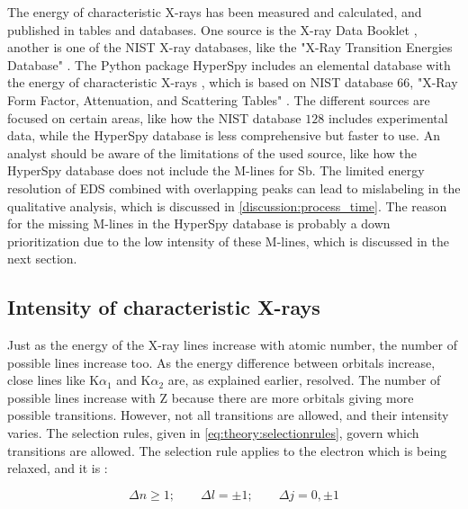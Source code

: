 The energy of characteristic X-rays has been measured and calculated, and published in tables and databases.
One source is the X-ray Data Booklet \cite{thompson_x-ray_2004}, another is one of the NIST X-ray databases, like the "X-Ray Transition Energies Database" \cite{nist_xraydatabase}.
The Python package HyperSpy includes an elemental database with the energy of characteristic X-rays \cite{hyperspy_1.7.1}, which is based on NIST database $66$, "X-Ray Form Factor, Attenuation, and Scattering Tables" \cite{nist_xraydatabase_hyperspy}.
The different sources are focused on certain areas, like how the NIST database $128$ includes experimental data, while the HyperSpy database is less comprehensive but faster to use.
An analyst should be aware of the limitations of the used source, like how the HyperSpy database does not include the M-lines for Sb.
The limited energy resolution of EDS combined with overlapping peaks can lead to mislabeling in the qualitative analysis, which is discussed in \cref{discussion:process_time}.
The reason for the missing M-lines in the HyperSpy database is probably a down prioritization due to the low intensity of these M-lines, which is discussed in the next section.



\subsection{Intensity of characteristic X-rays}
\label{theory:xray_formation:intensity}

Just as the energy of the X-ray lines increase with atomic number, the number of possible lines increase too.
As the energy difference between orbitals increase, close lines like K$\alpha_1$ and K$\alpha_2$ are, as explained earlier, resolved.
The number of possible lines increase with Z because there are more orbitals giving more possible transitions.
However, not all transitions are allowed, and their intensity varies.
The selection rules, given in \cref{eq:theory:selectionrules}, govern which transitions are allowed.
The selection rule applies to the electron which is being relaxed, and it is \cite[Sec. 8.2.2.2]{hollas_modern_2004}:

\begin{equation}
    \label{eq:theory:selectionrules}
    \Delta n \ge 1;\qquad \Delta l  = \pm 1;\qquad \Delta j = 0, \pm 1
\end{equation}

